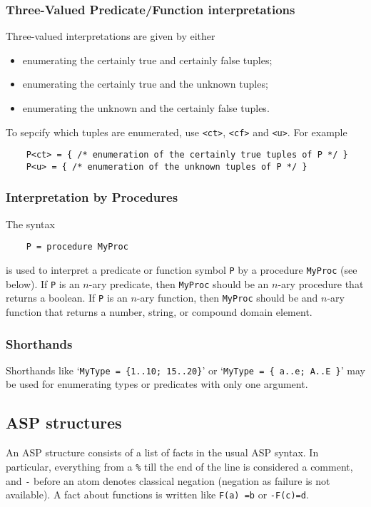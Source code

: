 \documentclass[a4]{article}
\newcommand{\code}[1]{{\tt #1}}
\begin{document}
\subsubsection{Three-Valued Predicate/Function interpretations}
Three-valued interpretations are given by either
\begin{itemize}
	\item enumerating the certainly true and certainly false tuples;
	\item enumerating the certainly true and the unknown tuples;
	\item enumerating the unknown and the certainly false tuples.
\end{itemize}
To sepcify which tuples are enumerated, use \code{<ct>}, \code{<cf>} and \code{<u>}.  For example
\begin{lstlisting}
	P<ct> = { /* enumeration of the certainly true tuples of P */ }
	P<u> = { /* enumeration of the unknown tuples of P */ }
\end{lstlisting}

\subsubsection{Interpretation by Procedures}
The syntax 
\begin{lstlisting}
	P = procedure MyProc
\end{lstlisting}
is used to interpret a predicate or function symbol \code{P} by a procedure \code{MyProc} (see below).  If \code{P} is an $n$-ary predicate, then \code{MyProc} should be an $n$-ary procedure that returns a boolean.  If \code{P} is an $n$-ary function, then \code{MyProc} should be and $n$-ary function that returns a number, string, or compound domain element.


\subsubsection{Shorthands}
Shorthands like `{\tt MyType = \{1..10; 15..20\}}' or `{\tt MyType = \{ a..e; A..E \}}' may be used for enumerating types or predicates with only one argument.



\subsection{ASP structures}
An ASP structure consists of a list of facts in the usual ASP syntax.  In particular, everything from a \code{\%} till the end of the line is considered a comment, and \code{-} before an atom denotes classical negation (negation as failure is not available).  A fact about functions is written like \code{F(a) =b} or \code{-F(c)=d}.
\end{document}

